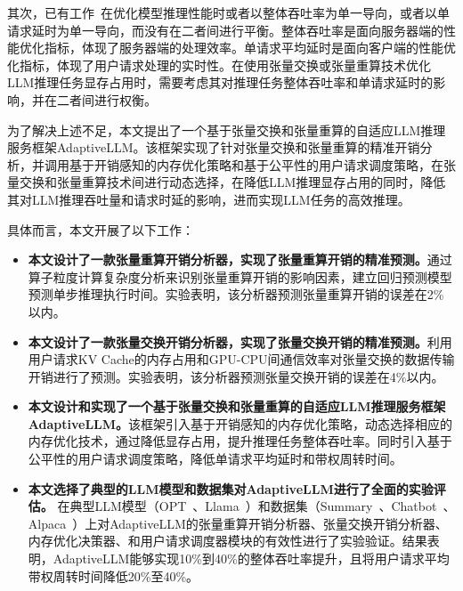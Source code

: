 其次，已有工作~\cite{Swapping, vLLM, SpecInfer}在优化模型推理性能时或者以整体吞吐率为单一导向，或者以单请求延时为单一导向，而没有在二者间进行平衡。整体吞吐率是面向服务器端的性能优化指标，体现了服务器端的处理效率。单请求平均延时是面向客户端的性能优化指标，体现了用户请求处理的实时性。在使用张量交换或张量重算技术优化LLM推理任务显存占用时，需要考虑其对推理任务整体吞吐率和单请求延时的影响，并在二者间进行权衡。

为了解决上述不足，本文提出了一个基于张量交换和张量重算的自适应LLM推理服务框架AdaptiveLLM。该框架实现了针对张量交换和张量重算的精准开销分析，并调用基于开销感知的内存优化策略和基于公平性的用户请求调度策略，在张量交换和张量重算技术间进行动态选择，在降低LLM推理显存占用的同时，降低其对LLM推理吞吐量和请求时延的影响，进而实现LLM任务的高效推理。

具体而言，本文开展了以下工作：

\begin{itemize} 
    
    \item \textbf{本文设计了一款张量重算开销分析器，实现了张量重算开销的精准预测。}通过算子粒度计算复杂度分析来识别张量重算开销的影响因素，建立回归预测模型预测单步推理执行时间。实验表明，该分析器预测张量重算开销的误差在2\%以内。
    
    \item \textbf{本文设计了一款张量交换开销分析器，实现了张量交换开销的精准预测。}利用用户请求KV Cache的内存占用和GPU-CPU间通信效率对张量交换的数据传输开销进行了预测。实验表明，该分析器预测张量交换开销的误差在4\%以内。

    \item \textbf{本文设计和实现了一个基于张量交换和张量重算的自适应LLM推理服务框架AdaptiveLLM。}该框架引入基于开销感知的内存优化策略，动态选择相应的内存优化技术，通过降低显存占用，提升推理任务整体吞吐率。同时引入基于公平性的用户请求调度策略，降低单请求平均延时和带权周转时间。
    
    \item \textbf{本文选择了典型的LLM模型和数据集对AdaptiveLLM进行了全面的实验评估。} 在典型LLM模型（OPT~\cite{OPT}、Llama~\cite{Llama}）和数据集（Summary~\cite{Summary}、Chatbot~\cite{Chatbot}、Alpaca~\cite{Alpaca}）上对AdaptiveLLM的张量重算开销分析器、张量交换开销分析器、内存优化决策器、和用户请求调度器模块的有效性进行了实验验证。结果表明，AdaptiveLLM能够实现10\%到40\%的整体吞吐率提升，且将用户请求平均带权周转时间降低20\%至40\%。

\end{itemize}